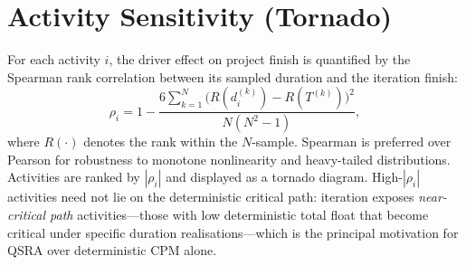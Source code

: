 \documentclass[10pt]{article}
\begin{document}
\section{Activity Sensitivity (Tornado)}
For each activity $i$, the driver effect on project finish is quantified by the Spearman rank correlation between its sampled duration and the iteration finish:
\begin{equation}
\rho_i = 1 - \frac{6 \sum_{k=1}^{N}\bigl(R(d_i^{(k)}) - R(T^{(k)})\bigr)^2}{N(N^2 - 1)},
\end{equation}
where $R(\cdot)$ denotes the rank within the $N$-sample. Spearman is preferred over Pearson for robustness to monotone nonlinearity and heavy-tailed distributions. Activities are ranked by $|\rho_i|$ and displayed as a tornado diagram. High-$|\rho_i|$ activities need not lie on the deterministic critical path: iteration exposes \emph{near-critical path} activities---those with low deterministic total float that become critical under specific duration realisations---which is the principal motivation for QSRA over deterministic CPM alone.
\end{document}
